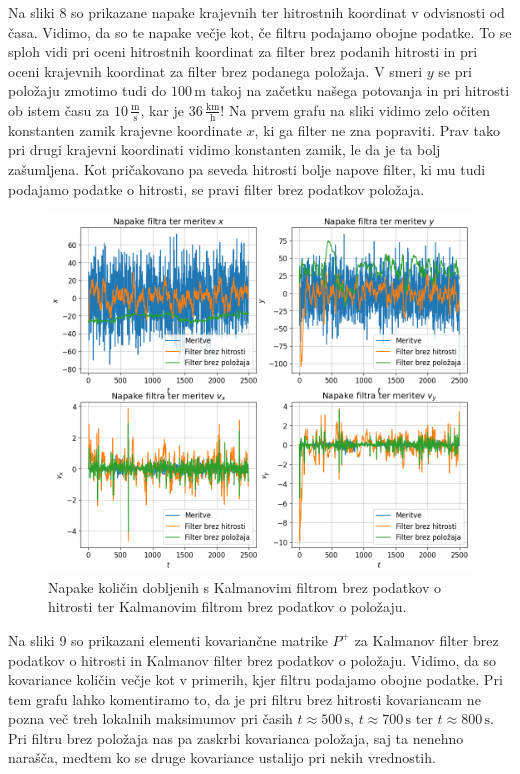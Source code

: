 \documentclass[slovene,11pt,a4paper]{article}
\begin{document}
Na sliki 8 so prikazane napake krajevnih ter hitrostnih koordinat v odvisnosti od časa. Vidimo, da so te napake večje kot, če filtru podajamo obojne podatke. To 
se sploh vidi pri oceni hitrostnih koordinat za filter brez podanih hitrosti in pri oceni krajevnih koordinat za filter brez podanega položaja. V smeri $y$ se pri položaju zmotimo tudi do $100 \, \text{m}$ takoj na začetku našega potovanja in pri hitrosti ob istem času za $10 \, \frac{\text{m}}{\text{s}}$, kar je $36 \, \frac{\text{km}}{\text{h}}$! Na prvem grafu na sliki vidimo zelo očiten konstanten zamik krajevne koordinate $x$, ki ga filter ne zna popraviti. Prav tako pri drugi krajevni koordinati vidimo konstanten zamik, le da je ta bolj zašumljena. Kot pričakovano pa seveda hitrosti bolje napove filter, ki mu tudi podajamo podatke o hitrosti, se pravi filter brez podatkov  položaja.

\begin{figure}[h!]
\centering
\includegraphics[width=14cm]{slika8.png}
\caption{Napake količin dobljenih s Kalmanovim filtrom brez podatkov o hitrosti ter Kalmanovim filtrom brez podatkov o položaju.}
\end{figure}

Na sliki 9 so prikazani elementi kovariančne matrike $P^+$ za Kalmanov filter brez podatkov o hitrosti in Kalmanov filter brez podatkov o položaju. Vidimo, da so kovariance količin večje kot v primerih, kjer filtru podajamo obojne podatke. Pri tem grafu lahko komentiramo to, da je pri filtru brez hitrosti kovariancam ne pozna več treh lokalnih maksimumov pri časih $t\approx 500 \, \text{s}$, $t\approx 700 \, \text{s}$ ter $t\approx 800 \, \text{s}$. Pri filtru brez položaja nas pa zaskrbi kovarianca položaja, saj ta nenehno narašča, medtem ko se druge kovariance ustalijo pri nekih vrednostih.
\end{document}
